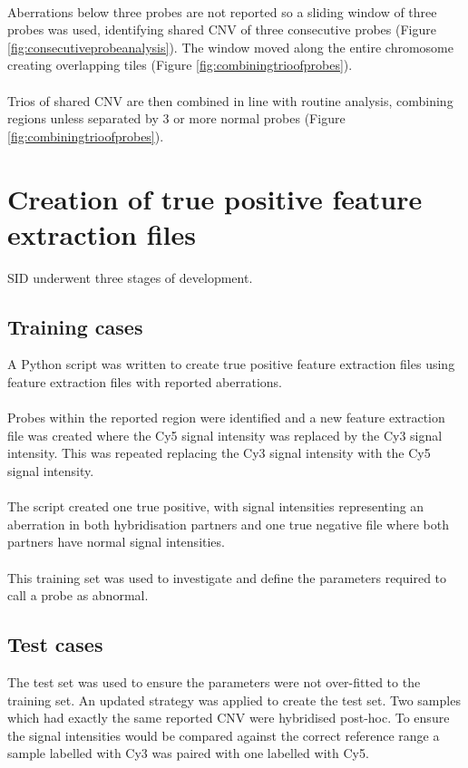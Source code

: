 \paragraph*{}
Aberrations below three probes are not reported so a sliding window of three probes was used, identifying shared CNV of three consecutive probes (Figure \ref{fig:consecutiveprobeanalysis}). The window moved along the entire chromosome creating overlapping tiles (Figure \ref{fig:combiningtrioofprobes}).

\paragraph*{}
Trios of shared CNV are then combined in line with routine analysis, combining regions unless separated by 3 or more normal probes (Figure \ref{fig:combiningtrioofprobes}).
\section{Creation of true positive feature extraction files}
SID underwent three stages of development.
\subsection{Training cases}
A Python script was written to create true positive feature extraction files using feature extraction files with reported aberrations. 
\paragraph*{}
Probes within the reported region were identified and a new feature extraction file was created where the Cy5 signal intensity was replaced by the Cy3 signal intensity. This was repeated replacing the Cy3 signal intensity with the Cy5 signal intensity.
\paragraph*{}
The script created one true positive, with signal intensities representing an aberration in both hybridisation partners and one true negative file where both partners have normal signal intensities.
\paragraph*{}
This training set was used to investigate and define the parameters required to call a probe as abnormal. 
\subsection{Test cases}
The test set was used to ensure the parameters were not over-fitted to the training set. An updated strategy was applied to create the test set. Two samples which had exactly the same reported CNV were hybridised post-hoc. 
To ensure the signal intensities would be compared against the correct reference range a sample labelled with Cy3 was paired with one labelled with Cy5. 
